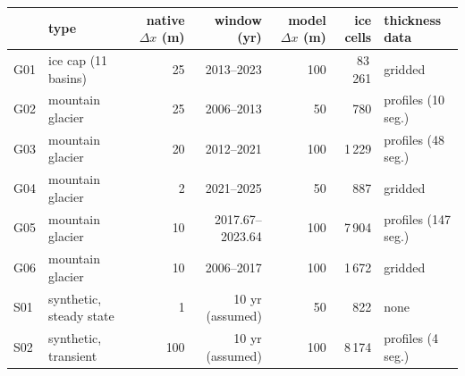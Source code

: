 \begin{tabular}{llrrrrl}
\toprule
 & type & native $\Delta x$ (m) & window (yr) & model $\Delta x$ (m) & ice cells & thickness data \\
\midrule
G01 & ice cap (11 basins) & 25 & 2013--2023 & 100 & 83\,261 & gridded \\
G02 & mountain glacier & 25 & 2006--2013 & 50 & 780 & profiles (10 seg.) \\
G03 & mountain glacier & 20 & 2012--2021 & 100 & 1\,229 & profiles (48 seg.) \\
G04 & mountain glacier & 2 & 2021--2025 & 50 & 887 & gridded \\
G05 & mountain glacier & 10 & 2017.67--2023.64 & 100 & 7\,904 & profiles (147 seg.) \\
G06 & mountain glacier & 10 & 2006--2017 & 100 & 1\,672 & gridded \\
S01 & synthetic, steady state & 1 & 10 yr (assumed) & 50 & 822 & none \\
S02 & synthetic, transient & 100 & 10 yr (assumed) & 100 & 8\,174 & profiles (4 seg.) \\
\bottomrule
\end{tabular}
